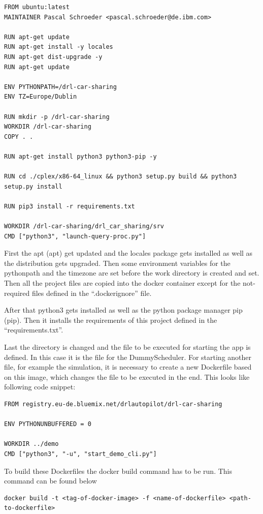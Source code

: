 \begin{lstlisting}
FROM ubuntu:latest
MAINTAINER Pascal Schroeder <pascal.schroeder@de.ibm.com>

RUN apt-get update 
RUN apt-get install -y locales
RUN apt-get dist-upgrade -y
RUN apt-get update

ENV PYTHONPATH=/drl-car-sharing
ENV TZ=Europe/Dublin

RUN mkdir -p /drl-car-sharing
WORKDIR /drl-car-sharing
COPY . .

RUN apt-get install python3 python3-pip -y

RUN cd ./cplex/x86-64_linux && python3 setup.py build && python3 setup.py install

RUN pip3 install -r requirements.txt

WORKDIR /drl-car-sharing/drl_car_sharing/srv
CMD ["python3", "launch-query-proc.py"]
\end{lstlisting}

First the \acs{apt} (\acl{apt}) get updated and the locales package gets installed as well as the distribution gets upgraded. Then some environment variables for the pythonpath and the timezone are set before the work directory is created and set. Then all the project files are copied into the docker container except for the not-required files defined in the ``.dockerignore'' file.

After that python3 gets installed as well as the python package manager \acs{pip} (\acl{pip}).  Then it installs the requirements of this project defined in the ``requirements.txt''. 

Last the directory is changed and the file to be executed for starting the app is defined. In this case it is the file for the DummyScheduler. For starting another file, for example the simulation, it is necessary to create a new Dockerfile based on this image, which changes the file to be executed in the end. This looks like following code snippet:

\begin{lstlisting}
FROM registry.eu-de.bluemix.net/drlautopilot/drl-car-sharing

ENV PYTHONUNBUFFERED = 0

WORKDIR ../demo
CMD ["python3", "-u", "start_demo_cli.py"]
\end{lstlisting}

To build these Dockerfiles the docker build command has to be run. This command can be found below

\begin{lstlisting}
docker build -t <tag-of-docker-image> -f <name-of-dockerfile> <path-to-dockerfile>
\end{lstlisting}

